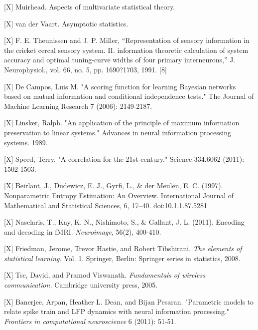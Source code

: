 \documentclass{article}
\begin{document}
[X]  Muirhead.  Aspects of multivariate statistical theory.

[X] van der Vaart.  Asymptotic statistics.

[X] F. E. Theunissen and J. P. Miller, ``Representation of sensory
information in the cricket cercal sensory system. II. information
theoretic calculation of system accuracy and optimal tuning-curve
widths of four primary interneurons,'' J. Neurophysiol., vol. 66,
no. 5, pp. 1690?1703, 1991.  [8]

[X] De Campos, Luis M. "A scoring function for learning Bayesian networks
based on mutual information and conditional independence tests." The
Journal of Machine Learning Research 7 (2006): 2149-2187.

[X] Linsker, Ralph. "An application of the principle of maximum
information preservation to linear systems." Advances in neural
information processing systems. 1989.

[X] Speed, Terry. "A correlation for the 21st century." Science
334.6062 (2011): 1502-1503.

[X] Beirlant, J., Dudewicz, E. J., Gyrfi, L., \& der Meulen,
E. C. (1997). Nonparametric Entropy Estimation: An
Overview. International Journal of Mathematical and Statistical
Sciences, 6, 17–40. doi:10.1.1.87.5281

[X] Naselaris, T., Kay, K. N., Nishimoto, S., \& Gallant,
J. L. (2011). Encoding and decoding in fMRI. \emph{Neuroimage}, 56(2),
400-410.

[X] Friedman, Jerome, Trevor Hastie, and Robert Tibshirani. \emph{The elements
of statistical learning.} Vol. 1. Springer, Berlin: Springer series in
statistics, 2008.

[X] Tse, David, and Pramod Viswanath. \emph{Fundamentals of wireless
communication.} Cambridge university press, 2005.

[X] Banerjee, Arpan, Heather L. Dean, and Bijan Pesaran. "Parametric
models to relate spike train and LFP dynamics with neural information
processing." \emph{Frontiers in computational neuroscience} 6 (2011): 51-51.
\end{document}
